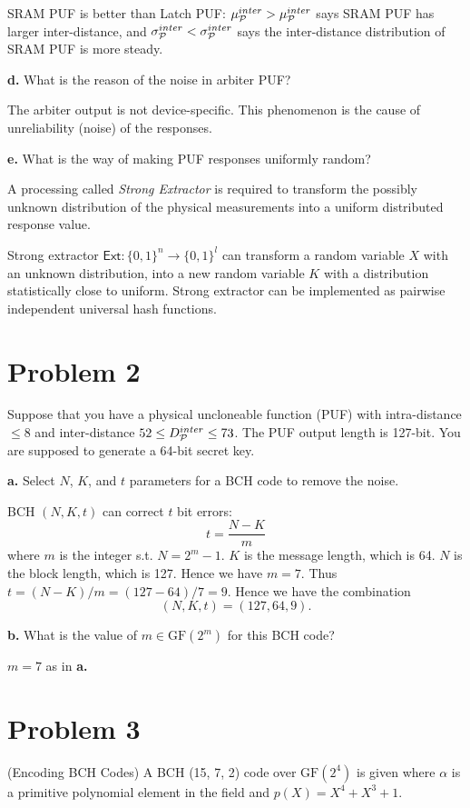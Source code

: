 \documentclass[12pt]{article}
\theoremstyle{plain}
\begin{document}
\Sol SRAM PUF is better than Latch PUF: $\mu_{\mathcal{P}}^{inter} > \mu_{\mathcal{P}}^{inter}$ says SRAM PUF has larger inter-distance, and $\sigma_{\mathcal{P}}^{inter} < \sigma_{\mathcal{P}}^{inter}$ says the inter-distance distribution of SRAM PUF is more steady.


{\bf d.} What is the reason of the noise in arbiter PUF?

\Sol The arbiter output is not device-specific. This
phenomenon is the cause of unreliability (noise) of the responses.

{\bf e.} What is the way of making PUF responses uniformly random?

\Sol A processing called \emph{Strong Extractor} is required to transform the possibly unknown distribution of
the physical measurements into a uniform distributed response value.

Strong extractor $\textsf{Ext} : \{0,1\}^n \to \{0,1\}^l$ can transform a random variable $X$ with an unknown distribution, into a new random variable $K$ with a distribution statistically close to uniform.
Strong extractor can be implemented as pairwise independent universal hash functions.

\section{Problem 2}
Suppose that you have a physical uncloneable function (PUF) with
intra-distance $\leq 8$ and inter-distance $52 \leq D_{\mathcal{P}}^{inter} \leq 73$. The PUF
output length is 127-bit. You are supposed to generate a 64-bit secret
key.

{\bf a.} Select $N$, $K$, and $t$ parameters for a BCH code to remove the noise.

\Sol BCH $(N,K,t)$ can correct $t$ bit errors:
$$t = \frac{N-K}{m}$$
where $m$ is the integer s.t. $N = 2^m-1$.
$K$ is the message length, which is 64. $N$ is the block length, which is 127. Hence we have $m=7$.
Thus $t = (N-K)/m = (127-64)/7 = 9$. Hence we have the combination
$$(N,K,t) = (127, 64, 9).$$

\newcommand{\GF}{\textrm{GF}}
{\bf b.} What is the value of $m \in \GF(2^m)$ for this BCH code?

\Sol $m=7$ as in {\bf a.}

\section{Problem 3}

(Encoding BCH Codes) A BCH (15, 7, 2) code over $\GF(2^4)$ is given where $\alpha$ is a primitive polynomial element in the field and $p(X) = X^4 + X^3 + 1$.
\end{document}
